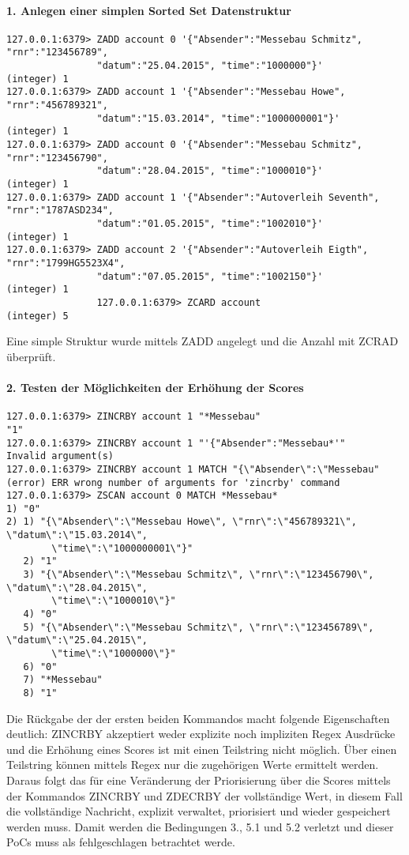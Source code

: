 \documentclass[11pt,oneside,a4paper,notitlepage]{article}
\begin{document}
\paragraph*{1. Anlegen einer simplen Sorted Set Datenstruktur}
\begin{verbatim}
127.0.0.1:6379> ZADD account 0 '{"Absender":"Messebau Schmitz", "rnr":"123456789", 
				"datum":"25.04.2015", "time":"1000000"}'
(integer) 1
127.0.0.1:6379> ZADD account 1 '{"Absender":"Messebau Howe", "rnr":"456789321", 
				"datum":"15.03.2014", "time":"1000000001"}'
(integer) 1
127.0.0.1:6379> ZADD account 0 '{"Absender":"Messebau Schmitz", "rnr":"123456790", 
				"datum":"28.04.2015", "time":"1000010"}'
(integer) 1
127.0.0.1:6379> ZADD account 1 '{"Absender":"Autoverleih Seventh", "rnr":"1787ASD234", 
				"datum":"01.05.2015", "time":"1002010"}'
(integer) 1
127.0.0.1:6379> ZADD account 2 '{"Absender":"Autoverleih Eigth", "rnr":"1799HG5523X4", 
				"datum":"07.05.2015", "time":"1002150"}'
(integer) 1
				127.0.0.1:6379> ZCARD account
(integer) 5
\end{verbatim}
Eine simple Struktur wurde mittels ZADD angelegt und die Anzahl mit ZCRAD überprüft.

%
\paragraph*{2. Testen der Möglichkeiten der Erhöhung der Scores}
\begin{verbatim}
127.0.0.1:6379> ZINCRBY account 1 "*Messebau"
"1"
127.0.0.1:6379> ZINCRBY account 1 "'{"Absender":"Messebau*'"
Invalid argument(s)
127.0.0.1:6379> ZINCRBY account 1 MATCH "{\"Absender\":\"Messebau"
(error) ERR wrong number of arguments for 'zincrby' command
127.0.0.1:6379> ZSCAN account 0 MATCH *Messebau*
1) "0"
2) 1) "{\"Absender\":\"Messebau Howe\", \"rnr\":\"456789321\", \"datum\":\"15.03.2014\", 
		\"time\":\"1000000001\"}"
   2) "1"
   3) "{\"Absender\":\"Messebau Schmitz\", \"rnr\":\"123456790\", \"datum\":\"28.04.2015\", 
   		\"time\":\"1000010\"}"
   4) "0"
   5) "{\"Absender\":\"Messebau Schmitz\", \"rnr\":\"123456789\", \"datum\":\"25.04.2015\", 
   		\"time\":\"1000000\"}"
   6) "0"
   7) "*Messebau"
   8) "1"
\end{verbatim}
Die Rückgabe der der ersten beiden Kommandos macht folgende Eigenschaften deutlich: ZINCRBY akzeptiert weder explizite noch impliziten Regex Ausdrücke und die Erhöhung eines Scores ist mit einen Teilstring nicht möglich. Über einen Teilstring können mittels Regex nur die zugehörigen Werte ermittelt werden. Daraus folgt das für eine Veränderung der Priorisierung über die Scores mittels der Kommandos ZINCRBY und ZDECRBY der vollständige Wert, in diesem Fall die vollständige Nachricht, explizit verwaltet, priorisiert und wieder gespeichert werden muss. Damit werden die Bedingungen 3., 5.1 und 5.2 verletzt und dieser PoCs muss als fehlgeschlagen betrachtet werde.
\end{document}
